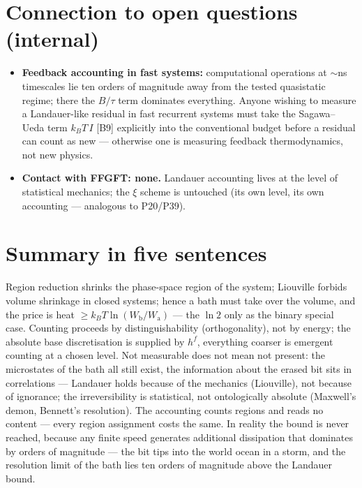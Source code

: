 \section{Connection to open questions (internal)}

\begin{itemize}[leftmargin=1.4em,itemsep=0.35em]
  \item \textbf{Feedback accounting in fast systems:} computational operations at
        ${\sim}$ns timescales lie ten orders of magnitude away from the tested
        quasistatic regime; there the $B/\tau$ term dominates everything. Anyone
        wishing to measure a Landauer-like residual in fast recurrent systems must
        take the Sagawa--Ueda term $k_B T\,I$ [B9] explicitly into the conventional
        budget before a residual can count as new --- otherwise one is measuring
        feedback thermodynamics, not new physics.
  \item \textbf{Contact with FFGFT: none.} Landauer accounting lives at the level
        of statistical mechanics; the $\xi$ scheme is untouched (its own level,
        its own accounting --- analogous to P20/P39).
\end{itemize}

\section{Summary in five sentences}

Region reduction shrinks the phase-space region of the system; Liouville forbids
volume shrinkage in closed systems; hence a bath must take over the volume, and
the price is heat $\ge k_B T \ln(W_{\text{b}}/W_{\text{a}})$ --- the $\ln 2$ only
as the binary special case. Counting proceeds by distinguishability
(orthogonality), not by energy; the absolute base discretisation is supplied by
$h^f$, everything coarser is emergent counting at a chosen level. Not measurable
does not mean not present: the microstates of the bath all still exist, the
information about the erased bit sits in correlations --- Landauer holds because
of the mechanics (Liouville), not because of ignorance; the irreversibility is
statistical, not ontologically absolute (Maxwell's demon, Bennett's resolution).
The accounting counts regions and reads no content --- every region assignment
costs the same. In reality the bound is never reached, because any finite speed
generates additional dissipation that dominates by orders of magnitude --- the bit
tips into the world ocean in a storm, and the resolution limit of the bath lies
ten orders of magnitude above the Landauer bound.

